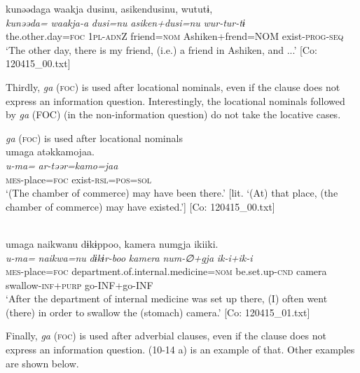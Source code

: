   \ex%
      \glll    kunəədaga  waakja  dusinu,  asikendusinu,                                     wututɨ,\\
      \textit{kunəəda=}  \textit{waakja-a}  \textit{dusi=nu}  \textit{asiken+dusi=nu}  \textit{wur-tur-tɨ}\\
      the.other.day=\textsc{foc}  1\textsc{pl}-\textsc{adn}Z  friend=\textsc{nom}  Ashiken+frend=NOM                         exist-\textsc{prog}-\textsc{seq}\\
      \glt       ‘The other day, there is my friend, (i.e.) a friend in Ashiken, and ...’ [Co: 120415\_00.txt]
    \z
\z

  Thirdly, \textit{ga} (\textsc{foc}) is used after locational nominals, even if the clause does not express an information question. Interestingly, the locational nominals followed by \textit{ga} (FOC) (in the non-information question) do not take the locative cases.

\ea\label{ex:10.15}   \textit{ga} (\textsc{foc}) is used after locational nominals\\
  \ea  %
      \glll    umaga  atəkkamojaa.\\
      \textit{u-ma=}  \textit{ar-təər=kamo=jaa}\\
      \textsc{mes}-place=\textsc{foc}  exist-\textsc{rsl}=\textsc{pos}=\textsc{sol}\\
      \glt       ‘(The chamber of commerce) may have been there.’ [lit. ‘(At) that place, (the chamber of commerce) may have existed.’] [Co: 120415\_00.txt]

  \ex\relax  [= (4-38 a)]\\
      \glll    umaga  naikwanu  dɨkɨppoo,   {\textbar}kamera{\textbar}  numgja  ikiiki.\\
      \textit{u-ma=}  \textit{naikwa=nu}  \textit{dɨkɨr-boo}    \textit{kamera}  \textit{num-∅+gja}  \textit{ik-i+ik-i}\\
      \textsc{mes}-place=\textsc{foc}  department.of.internal.medicine=\textsc{nom}  be.set.up-\textsc{cnd}   camera  swallow-\textsc{inf}+\textsc{purp}  go-INF+go-INF\\
      \glt       ‘After the department of internal medicine was set up there, (I) often went (there) in order to swallow the (stomach) camera.’ [Co: 120415\_01.txt]
    \z
\z

  Finally, \textit{ga} (\textsc{foc}) is used after adverbial clauses, even if the clause does not express an information question. (10-14 a) is an example of that. Other examples are shown below.

